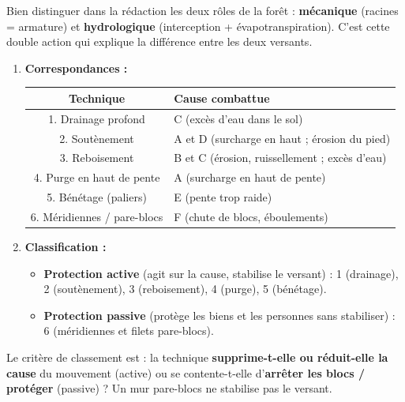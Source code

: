 \documentclass[11pt]{article}
\begin{document}
\begin{attention}
Bien distinguer dans la rédaction les deux rôles de la forêt : \textbf{mécanique} (racines = armature) et \textbf{hydrologique} (interception + évapotranspiration). C'est cette double action qui explique la différence entre les deux versants.
\end{attention}

\begin{corrige}
\tcblower
\begin{enumerate}
\item \textbf{Correspondances :}
      \begin{center}
      \begin{tabular}{|c|l|}\hline
      \textbf{Technique} & \textbf{Cause combattue} \\ \hline
      1. Drainage profond & C (excès d'eau dans le sol) \\ \hline
      2. Soutènement & A et D (surcharge en haut ; érosion du pied) \\ \hline
      3. Reboisement & B et C (érosion, ruissellement ; excès d'eau) \\ \hline
      4. Purge en haut de pente & A (surcharge en haut de pente) \\ \hline
      5. Bénétage (paliers) & E (pente trop raide) \\ \hline
      6. Méridiennes / pare-blocs & F (chute de blocs, éboulements) \\ \hline
      \end{tabular}
      \end{center}
\item \textbf{Classification :}
      \begin{itemize}
      \item \textbf{Protection active} (agit sur la cause, stabilise le versant) : 1 (drainage), 2 (soutènement), 3 (reboisement), 4 (purge), 5 (bénétage).
      \item \textbf{Protection passive} (protège les biens et les personnes sans stabiliser) : 6 (méridiennes et filets pare-blocs).
      \end{itemize}
\end{enumerate}
\end{corrige}
\begin{attention}
Le critère de classement est : la technique \textbf{supprime-t-elle ou réduit-elle la cause} du mouvement (active) ou se contente-t-elle d'\textbf{arrêter les blocs / protéger} (passive) ? Un mur pare-blocs ne stabilise pas le versant.
\end{attention}
\end{document}
